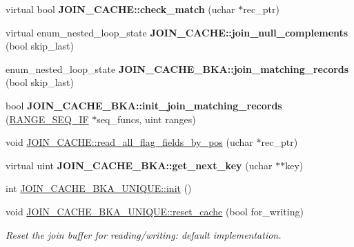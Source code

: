 \begin{DoxyCompactItemize}
\item 
\mbox{\label{group__Query__Optimizer_gab160a0ff435a7a1da8bb065ba03f1573}} 
virtual bool {\bfseries J\+O\+I\+N\+\_\+\+C\+A\+C\+H\+E\+::check\+\_\+match} (uchar $\ast$rec\+\_\+ptr)
\item 
\mbox{\label{group__Query__Optimizer_ga08fb808afb3705abba0f0bfaf5798d05}} 
virtual enum\+\_\+nested\+\_\+loop\+\_\+state {\bfseries J\+O\+I\+N\+\_\+\+C\+A\+C\+H\+E\+::join\+\_\+null\+\_\+complements} (bool skip\+\_\+last)
\item 
\mbox{\label{group__Query__Optimizer_ga5ae42b1e09c108b419fb9eefac1312ef}} 
enum\+\_\+nested\+\_\+loop\+\_\+state {\bfseries J\+O\+I\+N\+\_\+\+C\+A\+C\+H\+E\+\_\+\+B\+K\+A\+::join\+\_\+matching\+\_\+records} (bool skip\+\_\+last)
\item 
\mbox{\label{group__Query__Optimizer_ga89ba1e9701fe4bab26bd70d79e91cd30}} 
bool {\bfseries J\+O\+I\+N\+\_\+\+C\+A\+C\+H\+E\+\_\+\+B\+K\+A\+::init\+\_\+join\+\_\+matching\+\_\+records} (\mbox{\hyperlink{structst__range__seq__if}{R\+A\+N\+G\+E\+\_\+\+S\+E\+Q\+\_\+\+IF}} $\ast$seq\+\_\+funcs, uint ranges)
\item 
void \mbox{\hyperlink{group__Query__Optimizer_ga812222f5f9eb4a9026c8ce89069ef8d7}{J\+O\+I\+N\+\_\+\+C\+A\+C\+H\+E\+::read\+\_\+all\+\_\+flag\+\_\+fields\+\_\+by\+\_\+pos}} (uchar $\ast$rec\+\_\+ptr)
\item 
\mbox{\label{group__Query__Optimizer_ga31d40beb0d805bd84dd9c1547450de48}} 
virtual uint {\bfseries J\+O\+I\+N\+\_\+\+C\+A\+C\+H\+E\+\_\+\+B\+K\+A\+::get\+\_\+next\+\_\+key} (uchar $\ast$$\ast$key)
\item 
int \mbox{\hyperlink{group__Query__Optimizer_gaa7ca6a85294c32bac8c69bea0c4e5fe1}{J\+O\+I\+N\+\_\+\+C\+A\+C\+H\+E\+\_\+\+B\+K\+A\+\_\+\+U\+N\+I\+Q\+U\+E\+::init}} ()
\item 
void \mbox{\hyperlink{group__Query__Optimizer_gafb1afc6322b69d01ea68b677b715ddc7}{J\+O\+I\+N\+\_\+\+C\+A\+C\+H\+E\+\_\+\+B\+K\+A\+\_\+\+U\+N\+I\+Q\+U\+E\+::reset\+\_\+cache}} (bool for\+\_\+writing)
\begin{DoxyCompactList}\small\item\em Reset the join buffer for reading/writing\+: default implementation. \end{DoxyCompactList}\item 
$$
\end{DoxyCompactItemize}
